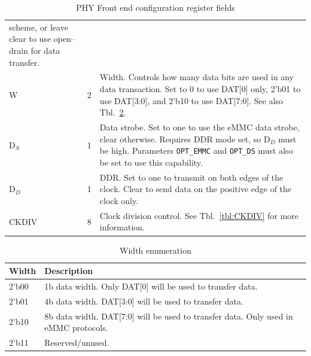 \documentclass{gqtekspec}
\begin{document}
\begin{table}
\begin{center}
\begin{tabular}{|p{1.2in}|p{0.5in}|p{4.0in}|}
	scheme, or leave clear to use open--drain for data transfer.
	\\
%
%
W & 2 & Width.  Controls how many data bits are used in any data transaction.
	Set to 0 to use DAT[0] only, 2'b01 to use DAT[3:0], and 2'b10 to use
	DAT[7:0].  See also Tbl.~\ref{tbl:PHY-WIDTH}. \\
D$_S$&1& Data strobe.  Set to one to use the eMMC data strobe, clear
	otherwise.  Requires DDR mode set, so D$_D$ must be high.  Parameters
	{\tt OPT\_EMMC} and {\tt OPT\_DS} must also be set to use this
	capability.\\
D$_D$ & 1 & DDR.  Set to one to transmit on both edges of the clock.  Clear
	to send data on the positive edge of the clock only. \\
CKDIV & 8 & Clock division control.  See Tbl.~\ref{tbl:CKDIV} for more
	information.
	\\\hline
\end{tabular}
\caption{PHY Front end configuration register fields}\label{tbl:PHY}
\end{center}\end{table}

\begin{table}\begin{center}
\begin{tabular}{|p{1.2in}|p{4.0in}|}\hline
	\rowcolor[gray]{0.85} Width & Description\\\hline\hline
2'b00 & 1b data width.  Only DAT[0] will be used to transfer data.\\
2'b01 & 4b data width.  DAT[3:0] will be used to transfer data.\\
2'b10 & 8b data width.  DAT[7:0] will be used to transfer data.  Only used in
	eMMC protocols.\\
2'b11 & Reserved/unused.  \\\hline
\end{tabular}
\caption{Width enumeration}\label{tbl:PHY-WIDTH}
\end{center}\end{table}
\end{document}
